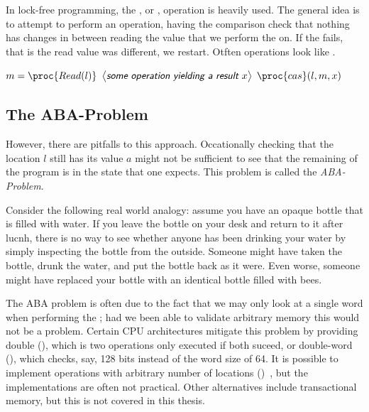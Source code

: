 In lock-free programming, the , or , operation is heavily used.
The general idea is to attempt to perform an operation, having the comparison check that nothing
has changes in between reading the value that we perform the  on. If the 
fails, that is the read value was different, we restart. Otften operations look like
.

\begin{codebox}
\li \While \Then
\li $m = \proc{Read(l)}$
\li $\lit{some operation yielding a result $x$}$
\li \If $\proc{cas}(l, m, x)$ \Then
\li \Return
\End \End
\end{codebox}

\subsection{The ABA-Problem\label{sec:aba-problem}}

However, there are pitfalls to this approach. Occationally checking that the location $l$ still has
its value $a$ might not be sufficient to see that the remaining of the program is in the state that
one expects. This problem is called the \emph{ABA-Problem}.

Consider the following real world analogy: assume you have an opaque bottle that is filled with
water. If you leave the bottle on your desk and return to it after lucnh, there is no way to see
whether anyone has been drinking your water by simply inspecting the bottle from the outside.
Someone might have taken the bottle, drunk the water, and put the bottle back as it were. Even
worse, someone might have replaced your bottle with an identical bottle filled with bees.

The ABA problem is often due to the fact that we may only look at a single word when performing the
; had we been able to validate arbitrary memory this would not be a problem. Certain CPU
architectures mitigate this problem by providing double  (), which
is two  operations only executed if both suceed, or double-word 
(), which checks, say, 128 bits instead of the word size of 64.  It is possible to
implement  operations with arbitrary number of locations
()~\cite{harris2002practical,luchangco2003nonblocking}, but the implementations are often
not practical. Other alternatives include transactional memory, but this is not covered in this
thesis.


